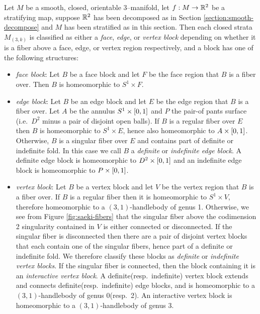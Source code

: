 \begin{theorem}
	\label{thm:block-structure}
	Let $M$ be a smooth, closed, orientable 3--manifold, let $f:M\to\mathbb{R}^2$ be a stratifying map, suppose $\mathbb{R}^2$ has been decomposed as in Section \ref{section:smooth-decompose} and $M$ has been stratified as in this section.
	Then each closed strata $M_{(3,k)}$ is classified as either a \emph{face}, \emph{edge}, or \emph{vertex block} depending on whether it is a fiber above a face, edge, or vertex region respectively, and a block has one of the following structures:
	\begin{itemize}
		\item \emph{face block}:
		Let $B$ be a face block and let $F$ be the face region that $B$ is a fiber over.
		Then $B$ is homeomorphic to $S^1\times F$.
		
		\item \emph{edge block}:
		Let $B$ be an edge block and let $E$ be the edge region that $B$ is a fiber over.
		Let $A$ be the annulus $S^1\times[0,1]$ and $P$ the pair-of pants surface (i.e.\ $D^2$ minus a pair of disjoint open balls).
		If $B$ is a regular fiber over $E$ then $B$ is homeomorphic to $S^1\times E$, hence also homeomorphic to $A\times[0,1]$.
		Otherwise, $B$ is a singular fiber over $E$ and contains part of definite or indefinite fold.
		In this case we call $B$ a \emph{definite} or \emph{indefinite edge block}.
		A definite edge block is homeomorphic to $D^2\times[0,1]$ and an indefinite edge block is homeomorphic to $P\times[0,1]$.

		\item \emph{vertex block}:
		Let $B$ be a vertex block and let $V$ be the vertex region that $B$ is a fiber over.
		If $B$ is a regular fiber then it is homeomorphic to $S^1\times V$, therefore homeomorphic to a $(3,1)$-handlebody of genus 1.
		Otherwise, we see from Figure \ref{fig:saeki-fibers} that the singular fiber above the codimension 2 singularity contained in $V$ is either connected or disconnected.
		If the singular fiber is disconnected then there are a pair of disjoint vertex blocks that each contain one of the singular fibers, hence part of a definite or indefinite fold.
		We therefore classify these blocks as \emph{definite} or \emph{indefinite vertex blocks}.
		If the singular fiber is connected, then the block containing it is an \emph{interactive vertex block}.
		A definite(resp.\ indefinite) vertex block extends and connects definite(resp.\ indefinite) edge blocks, and is homeomorphic to a $(3,1)$-handlebody of genus 0(resp.\ 2).
		An interactive vertex block is homeomorphic to a $(3,1)$-handlebody of genus 3.
	\end{itemize}
\end{theorem}

